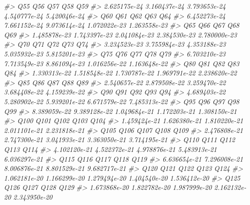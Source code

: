 \documentclass[]{article}
\newenvironment{Shaded}{\begin{snugshade}}{\end{snugshade}}
\newcommand{\CommentTok}[1]{\textcolor[rgb]{0.56,0.35,0.01}{\textit{#1}}}
\begin{document}
\begin{Shaded}
\begin{Highlighting}[]
\CommentTok{#>           Q55           Q56           Q57           Q58           Q59 }
\CommentTok{#>  2.625175e-24  3.160437e-24  3.793653e-24  4.540777e-24  5.420046e-24 }
\CommentTok{#>           Q60           Q61           Q62           Q63           Q64 }
\CommentTok{#>  6.452273e-24  7.661152e-24  9.073614e-24  1.072022e-23  1.263558e-23 }
\CommentTok{#>           Q65           Q66           Q67           Q68           Q69 }
\CommentTok{#>  1.485878e-23  1.743397e-23  2.041084e-23  2.384530e-23  2.780000e-23 }
\CommentTok{#>           Q70           Q71           Q72           Q73           Q74 }
\CommentTok{#>  3.234523e-23  3.755984e-23  4.353188e-23  5.035932e-23  5.815201e-23 }
\CommentTok{#>           Q75           Q76           Q77           Q78           Q79 }
\CommentTok{#>  6.703210e-23  7.713549e-23  8.861094e-23  1.016256e-22  1.163648e-22 }
\CommentTok{#>           Q80           Q81           Q82           Q83           Q84 }
\CommentTok{#>  1.330313e-22  1.518548e-22  1.730787e-22  1.969791e-22  2.238620e-22 }
\CommentTok{#>           Q85           Q86           Q87           Q88           Q89 }
\CommentTok{#>  2.540657e-22  2.879508e-22  3.259470e-22  3.684408e-22  4.159239e-22 }
\CommentTok{#>           Q90           Q91           Q92           Q93           Q94 }
\CommentTok{#>  4.689403e-22  5.280902e-22  5.939201e-22  6.671579e-22  7.485313e-22 }
\CommentTok{#>           Q95           Q96           Q97           Q98           Q99 }
\CommentTok{#>  8.389059e-22  9.389128e-22  1.049684e-21  1.172203e-21  1.308150e-21 }
\CommentTok{#>          Q100          Q101          Q102          Q103          Q104 }
\CommentTok{#>  1.459424e-21  1.626380e-21  1.810220e-21  2.011101e-21  2.231818e-21 }
\CommentTok{#>          Q105          Q106          Q107          Q108          Q109 }
\CommentTok{#>  2.476808e-21  2.747300e-21  3.041933e-21  3.363050e-21  3.714195e-21 }
\CommentTok{#>          Q110          Q111          Q112          Q113          Q114 }
\CommentTok{#>  4.102120e-21  4.522372e-21  4.978876e-21  5.483913e-21  6.036297e-21 }
\CommentTok{#>          Q115          Q116          Q117          Q118          Q119 }
\CommentTok{#>  6.636654e-21  7.296008e-21  8.006876e-21  8.801529e-21  9.682717e-21 }
\CommentTok{#>          Q120          Q121          Q122          Q123          Q124 }
\CommentTok{#>  1.062181e-20  1.166299e-20  1.279494e-20  1.404540e-20  1.536412e-20 }
\CommentTok{#>          Q125          Q126          Q127          Q128          Q129 }
\CommentTok{#>  1.673868e-20  1.822782e-20  1.987999e-20  2.162132e-20  2.343950e-20 }

\end{Highlighting}
\end{Shaded}
\end{document}
